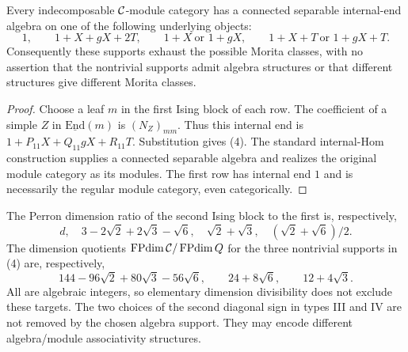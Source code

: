 \begin{corollary}
Every indecomposable $\mathcal C$-module category has a connected separable
internal-end algebra on one of the following underlying objects:
\[
1,\qquad 1+X+gX+2T,\qquad 1+X\ \text{or }1+gX,
\qquad 1+X+T\ \text{or }1+gX+T. \tag{4}
\]
Consequently these supports exhaust the possible Morita classes, with
no assertion that the nontrivial supports admit algebra structures or
that different structures give different Morita classes.
\end{corollary}
\begin{proof}
Choose a leaf $m$ in the first Ising block of each row. The coefficient
of a simple $Z$ in $\underline{\mathrm{End}}(m)$ is $(N_Z)_{mm}$.
Thus this internal end is
$1+P_{11}X+Q_{11}gX+R_{11}T$. Substitution gives (4).
The standard internal-Hom construction supplies a connected separable
algebra and realizes the original module category as its modules.
The first row has internal end $1$ and is necessarily the regular
module category, even categorically.
\end{proof}

The Perron dimension ratio of the second Ising block to the first is,
respectively,
\[
d,\quad 3-2\sqrt2+2\sqrt3-\sqrt6,\quad
\sqrt2+\sqrt3,\quad(\sqrt2+\sqrt6)/2.
\]
The dimension quotients $\operatorname{FPdim}\mathcal C/\operatorname{FPdim} Q$ for the three nontrivial
supports in (4) are, respectively,
\[
144-96\sqrt2+80\sqrt3-56\sqrt6,
\qquad24+8\sqrt6,\qquad12+4\sqrt3.
\]
All are algebraic integers, so elementary dimension divisibility does
not exclude these targets. The two choices of the second diagonal sign
in types III and IV are not removed by the chosen algebra support.
They may encode different algebra/module associativity structures.

